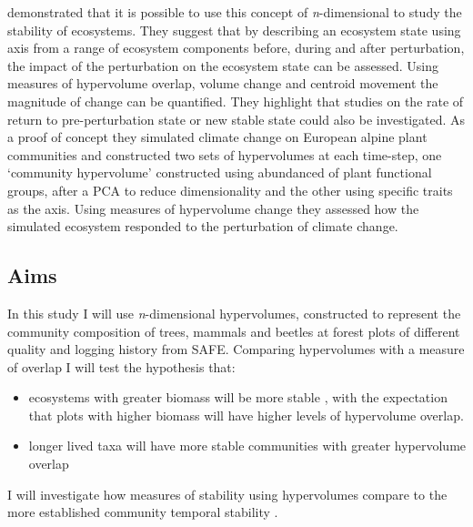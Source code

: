  
\cite{Barros2016} demonstrated that it is possible to use this concept of \emph{n}-dimensional to study the stability of ecosystems. They suggest that by describing an ecosystem state using axis from a range of ecosystem components before, during and after perturbation, the impact of the perturbation on the ecosystem state can be assessed. Using measures of hypervolume overlap, volume change and centroid movement the magnitude of change can be quantified. They highlight that studies on the rate of return to pre-perturbation state or new stable state could also be investigated. As a proof of concept they simulated climate change on European alpine plant communities and constructed two sets of hypervolumes at each time-step, one `community hypervolume' constructed using abundanced of plant functional groups, after a PCA to reduce dimensionality and the other using specific traits as the axis. Using measures of hypervolume change they assessed how the simulated ecosystem responded to the perturbation of climate change.


\subsection{Aims}

In this study I will use \emph{n}-dimensional hypervolumes, constructed to represent the community composition of trees, mammals and beetles at forest plots of different quality and logging history from SAFE. Comparing hypervolumes with a measure of overlap I will test the hypothesis that:

\begin{itemize}
	\item ecosystems with greater biomass will be more stable \citep{Tilman2006}, with the expectation that plots with higher biomass will have higher levels of hypervolume overlap.
	\item longer lived taxa will have more stable communities with greater hypervolume overlap
\end{itemize}
 
 I will investigate how measures of stability using hypervolumes compare to the more established community temporal stability \citep{Lehman2000}.
 	